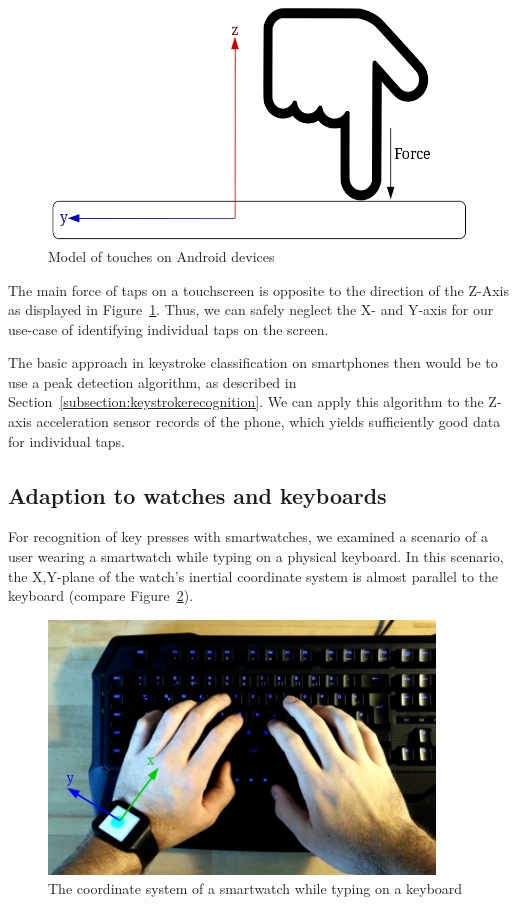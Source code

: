 \begin{figure}
    \centering
    \includegraphics[width=\textwidth]{figures/TapDirection.png}
    \caption{Model of touches on Android devices}
    \label{fig:touchdirection}
\end{figure}
The main force of taps on a touchscreen is opposite to the direction of the Z-Axis as displayed in Figure~\ref{fig:touchdirection}. Thus, we can safely neglect the X- and Y-axis for our use-case of identifying individual taps on the screen.

The basic approach in keystroke classification on smartphones then would be to use a peak detection algorithm, as described in Section~\ref{subsection:keystrokerecognition}. We can apply this algorithm to the Z-axis acceleration sensor records of the phone, which yields sufficiently good data for individual taps.

\subsection{Adaption to watches and keyboards}
For recognition of key presses with smartwatches, we examined a scenario of a user wearing a smartwatch while typing on a physical keyboard. In this scenario, the X,Y-plane of the watch's inertial coordinate system is almost parallel to the keyboard (compare Figure~\ref{fig:watchcoordinate}).

\begin{figure}
    \centering
    \includegraphics[width=0.9147\textwidth]{figures/WatchCoordinateSystem.png}
    \caption{The coordinate system of a smartwatch while typing on a keyboard}
    \label{fig:watchcoordinate}
\end{figure}

